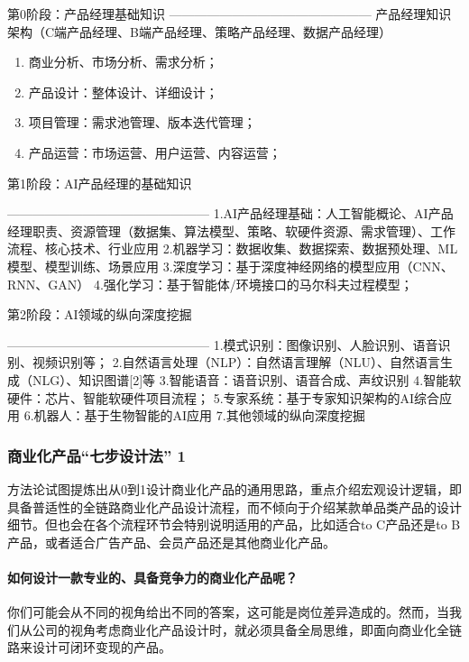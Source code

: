 \documentclass[letterpaper,11pt,english]{sphinxmanual}
\begin{document}
第0阶段：产品经理基础知识 ————————————————
产品经理知识架构（C端产品经理、B端产品经理、策略产品经理、数据产品经理）
\begin{enumerate}
%
\item {} 
商业分析、市场分析、需求分析；

\item {} 
产品设计：整体设计、详细设计；

\item {} 
项目管理：需求池管理、版本迭代管理；

\item {} 
产品运营：市场运营、用户运营、内容运营；

\end{enumerate}

第1阶段：AI产品经理的基础知识

————————————————
1.AI产品经理基础：人工智能概论、AI产品经理职责、资源管理（数据集、算法模型、策略、软硬件资源、需求管理）、工作流程、核心技术、行业应用
2.机器学习：数据收集、数据探索、数据预处理、ML模型、模型训练、场景应用
3.深度学习：基于深度神经网络的模型应用（CNN、RNN、GAN）
4.强化学习：基于智能体/环境接口的马尔科夫过程模型；

第2阶段：AI领域的纵向深度挖掘

———————————————— 1.模式识别：图像识别、人脸识别、语音识别、视频识别等；
2.自然语言处理（NLP）：自然语言理解（NLU）、自然语言生成（NLG）、知识图谱{[}2{]}等
3.智能语音：语音识别、语音合成、声纹识别
4.智能软硬件：芯片、智能软硬件项目流程；
5.专家系统：基于专家知识架构的AI综合应用 6.机器人：基于生物智能的AI应用
7.其他领域的纵向深度挖掘


\subsubsection{商业化产品“七步设计法” 1\sphinxfootnotemark[403]}
\label{\detokenize{chapter_knowledge/steps:id1}}\label{\detokenize{chapter_knowledge/steps::doc}}%
\begin{footnotetext}[403]\sphinxAtStartFootnote
{}
%
\end{footnotetext}\ignorespaces 
方法论试图提炼出从0到1设计商业化产品的通用思路，重点介绍宏观设计逻辑，即具备普适性的全链路商业化产品设计流程，而不倾向于介绍某款单品类产品的设计细节。但也会在各个流程环节会特别说明适用的产品，比如适合to
C产品还是to B产品，或者适合广告产品、会员产品还是其他商业化产品。


\paragraph{如何设计一款专业的、具备竞争力的商业化产品呢？}
\label{\detokenize{chapter_knowledge/steps:id2}}
你们可能会从不同的视角给出不同的答案，这可能是岗位差异造成的。然而，当我们从公司的视角考虑商业化产品设计时，就必须具备全局思维，即面向商业化全链路来设计可闭环变现的产品。
\end{document}
